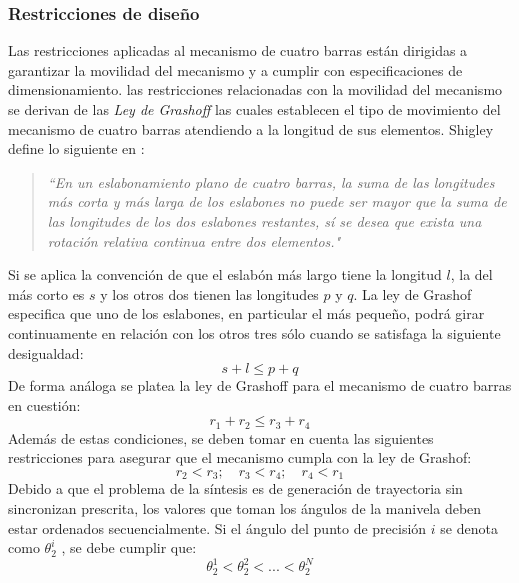 \subsubsection{Restricciones de diseño}\label{sec:Restricciones de diseño MEC}
Las restricciones aplicadas al mecanismo de cuatro barras están dirigidas a garantizar la movilidad del mecanismo y a cumplir con especificaciones de dimensionamiento. las restricciones relacionadas con la movilidad del mecanismo se derivan de las \textit{Ley de Grashoff} las cuales establecen el tipo de movimiento del mecanismo de cuatro barras atendiendo a la longitud de sus elementos. Shigley define lo siguiente en \cite{shigley1983teoria}:
\begin{quote}
\textit{``{En un eslabonamiento plano de cuatro barras, la suma de las longitudes más corta y más larga de los eslabones no puede ser mayor que la suma de las longitudes de los dos eslabones restantes, sí se desea que exista una rotación relativa continua entre dos elementos}."} 
\end{quote}
Si se aplica la convención de que el eslabón más largo tiene la longitud $l$, la del más corto es $s$ y los otros dos tienen las longitudes $p$ y $q$. La ley de Grashof especifica que uno de los eslabones, en particular el más pequeño, podrá girar continuamente en relación con los otros tres sólo cuando se satisfaga la siguiente desigualdad:
\begin{equation}
s+l \leq p+q
\end{equation}
De forma análoga se platea la ley de Grashoff para el mecanismo de cuatro barras en cuestión:
\begin{equation}
r_1+r_2 \leq r_3+r_4
\end{equation}
Además de estas condiciones, se deben tomar en cuenta las siguientes restricciones  para asegurar que el mecanismo cumpla con la ley de Grashof:
\begin{equation}
r_2 < r_3;\quad r_3 < r_4;\quad r_4 < r_1 
\end{equation}
Debido a que el problema de la síntesis es de generación de trayectoria sin sincronizan prescrita, los valores que toman los ángulos de la manivela deben estar ordenados secuencialmente. Si el ángulo
del punto de precisión $i$ se denota como $\theta^i_2$ , se debe cumplir que:
\begin{equation}
\theta^1_2 < \theta^2_2< ... < \theta^N_2
\end{equation}
